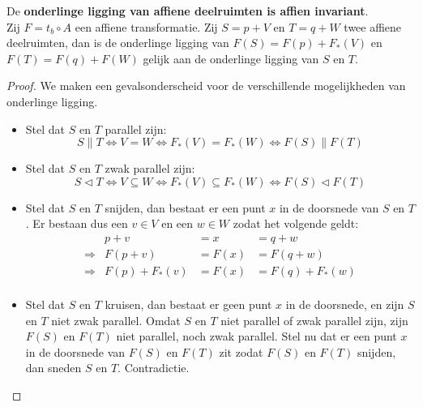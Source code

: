 \documentclass[main.tex]{subfiles}
\begin{document}
\begin{st}
  De \textbf{onderlinge ligging van affiene deelruimten is affien invariant}.\\
  Zij $F = t_{b} \circ A$ een affiene transformatie.
  Zij $S= p+V$ en $T= q+W$ twee affiene deelruimten, dan is de onderlinge ligging van $F(S) = F(p) + F_{*}(V)$ en $F(T) = F(q) + F(W)$ gelijk aan de onderlinge ligging van $S$ en $T$.  

  \begin{proof}
    We maken een gevalsonderscheid voor de verschillende mogelijkheden van onderlinge ligging.
    \begin{itemize}
    \item Stel dat $S$ en $T$ parallel zijn:
      \[ S \parallel T \Leftrightarrow V = W \Leftrightarrow F_{*}(V)=F_{*}(W) \Leftrightarrow F(S) \parallel F(T) \]
    \item Stel dat $S$ en $T$ zwak parallel zijn:
      \[ S \triangleleft T \Leftrightarrow V \subseteq W \Leftrightarrow F_{*}(V)\subseteq F_{*}(W) \Leftrightarrow F(S) \triangleleft F(T) \]
    \item Stel dat $S$ en $T$ snijden, dan bestaat er een punt $x$ in de doorsnede van $S$ en $T$.
      Er bestaan dus een $v\in V$ en een $w \in W$ zodat het volgende geldt:
      \[
      \begin{array}{rrll}
                      & p + v  &= x   &= q + w\\
         \Rightarrow  & F(p+v) &=F(x) &= F(q+w)\\
         \Rightarrow  & F(p)+F_{*}(v) &= F(x) &= F(q)+F_{*}(w)\\
      \end{array}
      \]
    \item Stel dat $S$ en $T$ kruisen, dan bestaat er geen punt $x$ in de doorsnede, en zijn $S$ en $T$ niet zwak parallel.
      Omdat $S$ en $T$ niet parallel of zwak parallel zijn, zijn $F(S)$ en $F(T)$ niet parallel, noch zwak parallel.
      Stel nu dat er een punt $x$ in de doorsnede van $F(S)$ en $F(T)$ zit zodat $F(S)$ en $F(T)$ snijden, dan sneden $S$ en $T$.
      Contradictie.
    \end{itemize}
  \end{proof}
\end{st}
\end{document}
